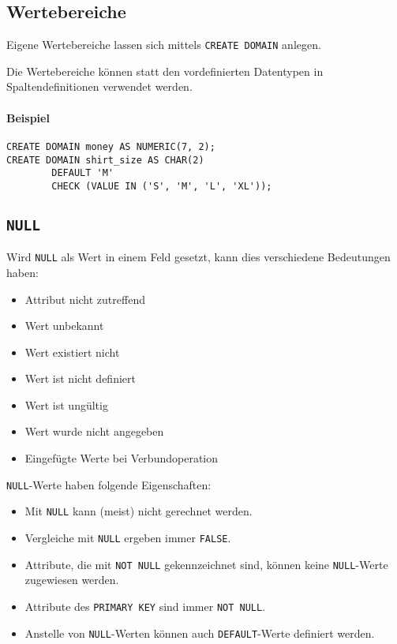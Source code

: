 \documentclass[a4paper, 11pt, accentcolor = tud3b]{tudreport}
\begin{document}
            \subsection{Wertebereiche} %
                Eigene Wertebereiche lassen sich mittels \lstinline|CREATE DOMAIN| anlegen.
                
                Die Wertebereiche können statt den vordefinierten Datentypen in Spaltendefinitionen verwendet werden.
                
                \paragraph{Beispiel}
                	\begin{lstlisting}
CREATE DOMAIN money AS NUMERIC(7, 2);
CREATE DOMAIN shirt_size AS CHAR(2)
		DEFAULT 'M'
		CHECK (VALUE IN ('S', 'M', 'L', 'XL'));
                	\end{lstlisting}

            \subsection{\lstinline|NULL|} %
            	Wird \lstinline|NULL| als Wert in einem Feld gesetzt, kann dies verschiedene Bedeutungen haben:
            	\begin{itemize}
            		\item Attribut nicht zutreffend
            		\item Wert unbekannt
            		\item Wert existiert nicht
            		\item Wert ist nicht definiert
            		\item Wert ist ungültig
            		\item Wert wurde nicht angegeben
            		\item Eingefügte Werte bei Verbundoperation
            	\end{itemize}
            	
            	\lstinline|NULL|-Werte haben folgende Eigenschaften:
            	\begin{itemize}
            		\item Mit \lstinline|NULL| kann (meist) nicht gerechnet werden.
            		\item Vergleiche mit \lstinline|NULL| ergeben immer \lstinline|FALSE|.
            		\item Attribute, die mit \lstinline|NOT NULL| gekennzeichnet sind, können keine \lstinline|NULL|-Werte zugewiesen werden.
            		\item Attribute des \lstinline|PRIMARY KEY| sind immer \lstinline|NOT NULL|.
            		\item Anstelle von \lstinline|NULL|-Werten können auch \lstinline|DEFAULT|-Werte definiert werden.
            	\end{itemize}
\end{document}

